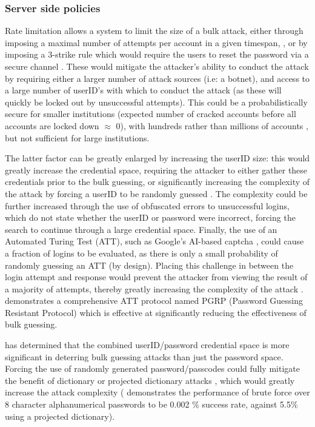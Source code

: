 \documentclass[british,11pt,a4paper]{article}
\begin{document}
\subsubsection{Server side policies}
Rate limitation allows a system to limit the size of a bulk attack, either through imposing a maximal number of attempts per account in a given timespan, \cite{Florencio2007-yp}, or by imposing a 3-strike rule which would require the users to reset the password via a secure channel \cite{Florencio2007-yp}. These would mitigate the attacker's ability to conduct the attack by requiring either a larger number of attack sources (i.e: a botnet), and access to a large number of userID's with which to conduct the attack (as these will quickly be locked out by unsuccessful attempts). This could be a probabilistically secure for smaller institutions (expected number of cracked accounts before all accounts are locked down $\approx$ 0), with hundreds rather than millions of accounts \cite{Florencio2007-yp}, but not sufficient for large institutions. 

The latter factor can be greatly enlarged by increasing the userID size: this would greatly increase the credential space, requiring the attacker to either gather these credentials prior to the bulk guessing, or significantly increasing the complexity of the attack by forcing a userID to be randomly guessed \cite{Kosamkar_undated-ik}. The complexity could be further increased through the use of obfuscated errors to unsuccessful logins, which do not state whether the userID or password were incorrect, forcing the search to continue through a large credential space. Finally, the use of an Automated Turing Test (ATT), such as Google's AI-based captcha \cite{noauthor_undated-lk}, could cause a fraction of logins to be evaluated, as there is only a small probability of randomly guessing an ATT (by design). Placing this challenge in between the login attempt and response would prevent the attacker from viewing the result of a majority of attempts, thereby greatly increasing the complexity of the attack \cite{Alsaleh2012-ek}. \citet{Alsaleh2012-ek} demonstrates a comprehensive ATT protocol named PGRP (Password Guessing Resistant Protocol) which is effective at significantly reducing the effectiveness of bulk guessing.

\citet{Florencio2007-yp} has determined that the combined userID/password credential space is more significant in deterring bulk guessing attacks than just the password space. Forcing the use of randomly generated password/passcodes could fully mitigate the benefit of dictionary or projected dictionary attacks \cite{Kosamkar_undated-ik}, which would greatly increase the attack complexity (\citet{Aspinall2013-sh} demonstrates the performance of brute force over 8 character alphanumerical passwords to be 0.002 \% success rate, against 5.5\% using a projected dictionary).
\end{document}
